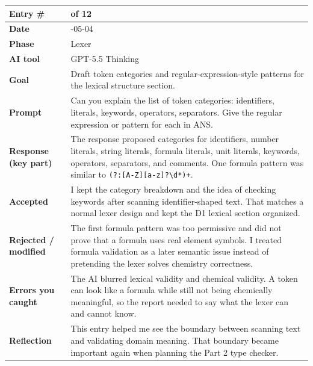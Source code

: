 \documentclass[11pt,a4paper]{article}
\newcommand{\code}[1]{\texttt{#1}}
\newcommand{\entrygap}{\vspace{8pt}}
\newenvironment{journalentry}{%
  \begin{center}\small\renewcommand{\arraystretch}{1.22}%
  \begin{tabular}{|>{\columncolor{anscodebg}\bfseries}p{3.0cm}|>{\RaggedRight\arraybackslash}p{12.25cm}|}%
  \hline
}{%
  \end{tabular}\end{center}\entrygap
}
\begin{document}
\begin{journalentry}
Entry \# & 2 of 12 \\ \hline
Date & 2026-05-04 \\ \hline
Phase & Lexer \\ \hline
AI tool & GPT-5.5 Thinking \\ \hline
Goal & Draft token categories and regular-expression-style patterns for the lexical structure section. \\ \hline
Prompt & Can you explain the list of token categories: identifiers, literals, keywords, operators, separators. Give the regular expression or pattern for each in ANS. \\ \hline
Response (key part) & The response proposed categories for identifiers, number literals, string literals, formula literals, unit literals, keywords, operators, separators, and comments. One formula pattern was similar to \code{(?:[A-Z][a-z]?\textbackslash d*)+}. \\ \hline
Accepted & I kept the category breakdown and the idea of checking keywords after scanning identifier-shaped text. That matches a normal lexer design and kept the D1 lexical section organized. \\ \hline
Rejected / modified & The first formula pattern was too permissive and did not prove that a formula uses real element symbols. I treated formula validation as a later semantic issue instead of pretending the lexer solves chemistry correctness. \\ \hline
Errors you caught & The AI blurred lexical validity and chemical validity. A token can look like a formula while still not being chemically meaningful, so the report needed to say what the lexer can and cannot know. \\ \hline
Reflection & This entry helped me see the boundary between scanning text and validating domain meaning. That boundary became important again when planning the Part 2 type checker. \\ \hline
\end{journalentry}
\end{document}
